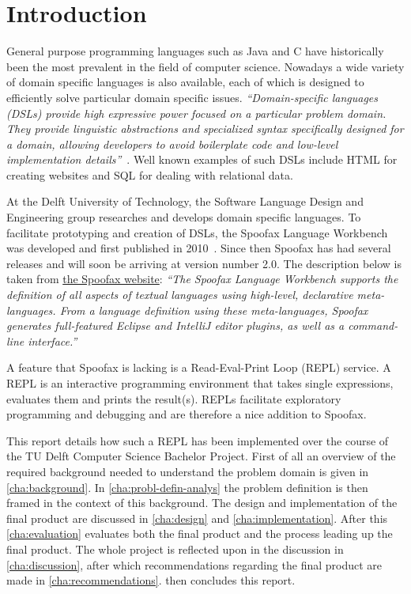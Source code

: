 \chapter{Introduction}
\label{cha:introduction}

General purpose programming languages such as Java and C have historically been
the most prevalent in the field of computer science. Nowadays a wide variety of
domain specific languages is also available, each of which is designed to
efficiently solve particular domain specific issues. \textit{``Domain-specific
languages (DSLs) provide high expressive power focused on a particular problem
domain. They provide linguistic abstractions and specialized syntax
specifically designed for a domain, allowing developers to avoid boilerplate
code and low-level implementation details''}~\cite{Kats10a}. Well known
examples of such DSLs include HTML for creating websites and SQL for dealing
with relational data.

At the Delft University of Technology, the Software Language Design and
Engineering group researches and develops domain specific languages. To
facilitate prototyping and creation of DSLs, the Spoofax Language Workbench was
developed and first published in 2010~\cite{Kats10a}. Since then Spoofax has had
several releases and will soon be arriving at version number 2.0. The
description below is taken from \href{http://spoofax.org}{the Spoofax website}:
\textit{``The Spoofax Language Workbench supports the definition of all aspects
of textual languages using high-level, declarative meta-languages. From a
language definition using these meta-languages, Spoofax generates full-featured
Eclipse and IntelliJ editor plugins, as well as a command-line interface.''}

A feature that Spoofax is lacking is a Read-Eval-Print Loop (REPL) service. A
REPL is an interactive programming environment that takes single expressions,
evaluates them and prints the result(s). REPLs facilitate exploratory
programming and debugging and are therefore a nice addition to Spoofax.

This report details how such a REPL has been implemented over the course of the
TU Delft Computer Science Bachelor Project. First of all an overview of the
required background needed to understand the problem domain is given in
\cref{cha:background}. In \cref{cha:probl-defin-analys} the problem definition
is then framed in the context of this background. The design and implementation
of the final product are discussed in \cref{cha:design} and
\cref{cha:implementation}. After this \cref{cha:evaluation} evaluates both the
final product and the process leading up the final product. The whole
project is reflected upon in the discussion in \cref{cha:discussion}, after
which recommendations regarding the final product are made in
\cref{cha:recommendations}.  then concludes this report.

